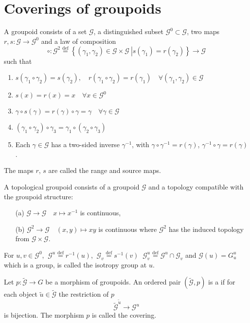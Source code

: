 \documentclass{beamer}
\theoremstyle{plain}
\newcommand{\G}{\mathcal{G}}
\newcommand{\ga}{\gamma}
\newcommand{\bydef}{\stackrel{\mathrm{def}}{=}}
\begin{document}
\section{Coverings of groupoids}
\begin{frame}
	\begin{definition}
	A \alert{groupoid} consists of a set $\G$, a distinguished subset $\G^0\subset\G$, two maps
	$r, s : \G\to \G^0$ and a law of composition
	$$
	\circ: \G^2\bydef\left\{\left.\left(\ga_1,\ga_2 \right) \in \G\times\G~\right| s\left(\ga_1\right)= r\left(\ga_2\right)\right\}\to \G
	$$
	such that
	\begin{enumerate}
		\item $s\left(\ga_1\circ\ga_2\right)=s\left(\ga_2\right), \quad r\left(\ga_1\circ\ga_2\right)=r\left(\ga_1\right)\quad \forall\left(\ga_1, \ga_2 \right) \in \G$
		\item $s\left(x\right)=r\left(x\right)=x \quad\forall x\in\G^0$
		\item $\ga\circ s\left(\ga\right)= r\left(\ga\right)\circ\ga = \ga\quad \forall\ga\in\G$
		\item $\left( \ga_1\circ\ga_2\right) \circ\ga_3=\ga_1\circ\left( \ga_2\circ\ga_3\right) $
		\item Each $\ga \in\G$ has a two-sided inverse $\ga^{-1}$, with $\ga\circ\ga^{-1}=r\left(\ga\right)$, $\ga^{-1}\circ\ga=r\left(\ga\right)$.
	\end{enumerate}
	The maps $r$, $s$ are called the \alert{range} and \alert{source} maps.
\end{definition}

\end{frame}
\begin{frame}
		\begin{definition}\label{groupoid_topological_defn}
		A \alert{topological groupoid} consists of a groupoid $\G$ and a topology compatible with the groupoid structure:
		\begin{enumerate}
			\item [(a)] $\G \to \G \quad x \mapsto x^{-1}$ is continuous,
			\item [(b)] $\G^2\to \G\quad \left(x,y\right)\mapsto xy$ is continuous where $\G^2$ has the induced topology from $\G \times \G$.
		\end{enumerate}
	\end{definition}
\begin{definition}
	For $u, v\in \G^0$, $~\G^u\bydef r^{-1}\left( u\right)$,  $~\G_v\bydef s^{-1}\left( v\right)$  $~\G^u_v\bydef \G^u\cap \G_v$ and
	$\G(u) = G^u_u$ which is a group, is called  the \alert{isotropy  group} at $u$.
\end{definition}
	
\begin{definition}\label{groupoid_covering_defn}
	Let $p : \widetilde{\G}\to G$ be a morphism of groupoids. An ordered pair
	$\left( \widetilde{\G}, p\right)$ is a  if for each object $\widetilde u \in \widetilde{\G}$ the restriction of $p$
	$$
	\widetilde{\G}^{\widetilde{u}}\to {\G}^u
	$$
	is bijection. The morphism $p$ is called the \alert{covering}. 
\end{definition}
\end{frame}
\end{document}
